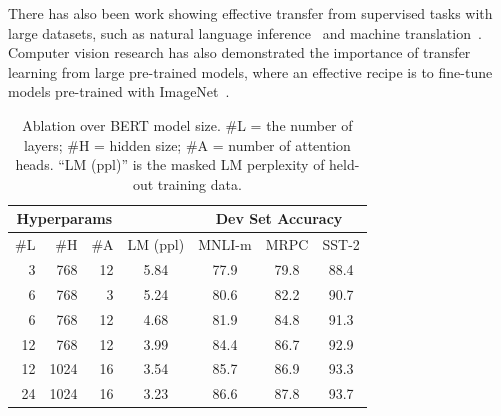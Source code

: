There has also been work showing effective transfer from supervised tasks with large datasets, such as natural language inference~\cite{conneau-EtAl:2017:EMNLP2017} and machine translation~\cite{mccann-etal:2017:_learn_trans}. 
Computer vision research has also demonstrated the importance of transfer learning from large pre-trained models, where an effective recipe is to fine-tune models pre-trained with ImageNet~\cite{imagenet_cvpr09, yosinski2014transferable}. 






\begin{table}[b]
\begin{center}
{\small
\begin{tabular}{@{}rrrcccc@{}}
  \toprule
  \multicolumn{3}{c}{Hyperparams}      &      & \multicolumn{3}{c}{Dev Set Accuracy} \\
  \midrule
  \#L & \#H &\#A & LM (ppl) & MNLI-m & MRPC &SST-2               \\
  \midrule
  \
   3 &  768 & 12 & 5.84 & 77.9 & 79.8 & 88.4 \\
   6 &  768 &  3 & 5.24 & 80.6 & 82.2 & 90.7 \\
   6 &  768 & 12 & 4.68 & 81.9 & 84.8 & 91.3 \\
  12 &  768 & 12 & 3.99 & 84.4 & 86.7 & 92.9 \\
  12 & 1024 & 16 & 3.54 & 85.7 & 86.9 & 93.3 \\
  24 & 1024 & 16 & 3.23 & 86.6 & 87.8 & 93.7 \\
\bottomrule
\end{tabular}
} %
\end{center}
\caption{\label{tab:size_ablation} Ablation over BERT model size. \#L = the number of layers; \#H = hidden size; \#A = number of attention heads. ``LM (ppl)'' is the masked LM perplexity of held-out training data.}
\end{table}




